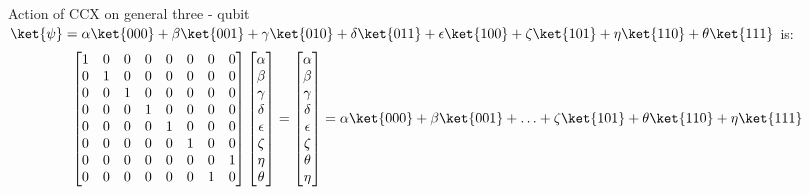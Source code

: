 \documentclass[12pt, oneside]{book}
\theoremstyle{definition}
\theoremstyle{definition}
\theoremstyle{remark}
\begin{document}
Action of CCX on general three - qubit $\ket{\psi} = \alpha\ket{000}+\beta\ket{001}+\gamma\ket{010}+\delta\ket{011}+\epsilon\ket{100}+\zeta\ket{101}+\eta\ket{110}+\theta\ket{111}$ is:
\[
    \begin{bmatrix} 
        1 & 0 & 0 & 0 & 0 & 0 & 0 & 0 \\
        0 & 1 & 0 & 0 & 0 & 0 & 0 & 0 \\
        0 & 0 & 1 & 0 & 0 & 0 & 0 & 0 \\
        0 & 0 & 0 & 1 & 0 & 0 & 0 & 0 \\
        0 & 0 & 0 & 0 & 1 & 0 & 0 & 0 \\
        0 & 0 & 0 & 0 & 0 & 1 & 0 & 0 \\
        0 & 0 & 0 & 0 & 0 & 0 & 0 & 1 \\
        0 & 0 & 0 & 0 & 0 & 0 & 1 & 0
    \end{bmatrix}\begin{bmatrix}
        \alpha \\
        \beta \\
        \gamma \\
        \delta \\
        \epsilon \\
        \zeta \\
        \eta \\
        \theta
    \end{bmatrix}=\begin{bmatrix}
        \alpha \\
        \beta \\
        \gamma \\
        \delta \\
        \epsilon \\
        \zeta \\
        \theta \\
        \eta
    \end{bmatrix}=\alpha\ket{000}+\beta\ket{001}+\ldots+\zeta\ket{101}+\theta\ket{110}+\eta\ket{111}
\]
\end{document}
